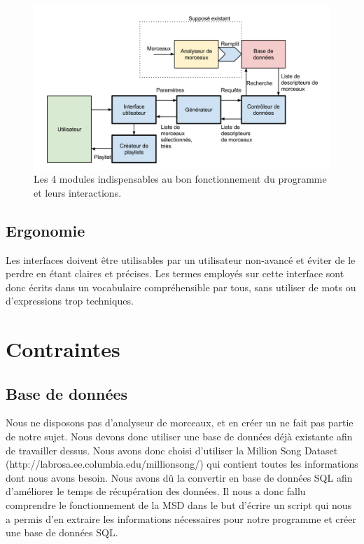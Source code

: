 \begin{figure}[H]
\includegraphics[width=\textwidth]{data/besoins/modules.png}
\caption{Les 4 modules indispensables au bon fonctionnement du programme et leurs
interactions.}
\end{figure}

\subsection{Ergonomie}
\label{besoins:nfonc:perf:erg}
Les interfaces doivent être utilisables par un utilisateur non-avancé et éviter 
de le perdre en étant claires et précises. Les termes employés sur cette 
interface sont donc écrits dans un vocabulaire compréhensible par tous, sans 
utiliser de mots ou d'expressions trop techniques.

\section{Contraintes}
\label{besoins:contraintes}

\subsection{Base de données}
\label{besoins:contraintes:bdd}
Nous ne disposons pas d’analyseur de morceaux, et en créer un ne fait pas partie
de notre sujet. Nous devons donc utiliser une base de données déjà
existante afin de travailler dessus. Nous avons donc choisi d’utiliser 
la Million
Song Dataset (http://labrosa.ee.columbia.edu/millionsong/) qui contient toutes
les informations dont nous avons besoin. Nous avons dû la convertir en base de 
données SQL afin d'améliorer le temps de récupération des données. Il nous a 
donc fallu comprendre le fonctionnement de la MSD dans le but d'écrire un 
script qui nous a permis d'en extraire les informations nécessaires pour notre 
programme et créer une base de données SQL.
    
